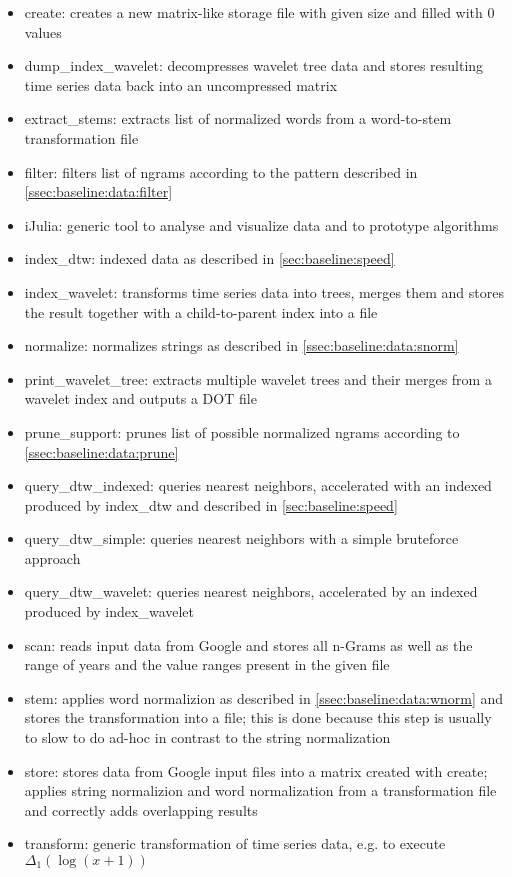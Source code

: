 \begin{itemize}
    \item create: creates a new matrix-like storage file with given size and filled with $0$ values
    \item dump\_index\_wavelet: decompresses wavelet tree data and stores resulting time series data back into an uncompressed matrix
    \item extract\_stems: extracts list of normalized words from a word-to-stem transformation file
    \item filter: filters list of ngrams according to the pattern described in \autoref{ssec:baseline:data:filter}
    \item iJulia: generic tool to analyse and visualize data and to prototype algorithms
    \item index\_dtw: indexed data as described in \autoref{sec:baseline:speed}
    \item index\_wavelet: transforms time series data into trees, merges them and stores the result together with a child-to-parent index into a file
    \item normalize: normalizes strings as described in \autoref{ssec:baseline:data:snorm}
    \item print\_wavelet\_tree: extracts multiple wavelet trees and their merges from a wavelet index and outputs a DOT file
    \item prune\_support: prunes list of possible normalized ngrams according to \autoref{ssec:baseline:data:prune}
    \item query\_dtw\_indexed: queries nearest neighbors, accelerated with an indexed produced by index\_dtw and described in \autoref{sec:baseline:speed}
    \item query\_dtw\_simple: queries nearest neighbors with a simple bruteforce approach
    \item query\_dtw\_wavelet: queries nearest neighbors, accelerated by an indexed produced by index\_wavelet
    \item scan: reads input data from Google and stores all n-Grams as well as the range of years and the value ranges present in the given file
    \item stem: applies word normalizion as described in \autoref{ssec:baseline:data:wnorm} and stores the transformation into a file; this is done because this step is usually to slow to do ad-hoc in contrast to the string normalization
    \item store: stores data from Google input files into a matrix created with create; applies string normalizion and word normalization from a transformation file and correctly adds overlapping results
    \item transform: generic transformation of time series data, e.g. to execute $\Delta_1(\log(x + 1))$
\end{itemize}


